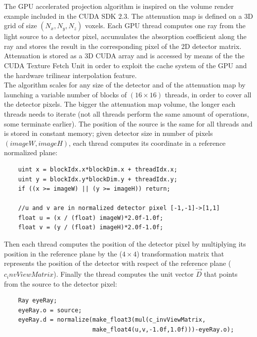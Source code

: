 \documentclass[12pt,a4paper]{report}
\begin{document}
The GPU accelerated projection algorithm is inspired on the volume render example included in the CUDA SDK $2.3$. 
The attenuation map is defined on a 3D grid of size $(N_x, N_y, N_z)$ voxels. 
Each GPU thread computes one ray from the light source to a detector pixel, accumulates the absorption coefficient along the ray and stores 
the result in the corresponding pixel of the 2D detector matrix. 
Attenuation is stored as a 3D CUDA array and is accessed by means of the the CUDA Texture Fetch Unit in order to exploit the cache 
system of the GPU and the hardware trilinear interpolation feature. \\
The algorithm scales for any size of the detector and of the attenuation map by launching a variable number of blocks of $(16\times 16)$ threads, in order 
to cover all the detector pixels. The bigger the attenuation map volume, the longer each threads needs to iterate (not all threads perform the same amount of operations, some 
terminate earlier). The position of the source is the same for all threads and is stored in constant memory; given detector size in number of pixels $(imageW,imageH)$, 
each thread computes its coordinate in a reference normalized plane: 

\vspace{5mm}
\lstset{language=C,basicstyle=\scriptsize}
\begin{lstlisting}
    uint x = blockIdx.x*blockDim.x + threadIdx.x;
    uint y = blockIdx.y*blockDim.y + threadIdx.y;
    if ((x >= imageW) || (y >= imageH)) return;

    //u and v are in normalized detector pixel [-1,-1]->[1,1]
    float u = (x / (float) imageW)*2.0f-1.0f;
    float v = (y / (float) imageH)*2.0f-1.0f;
\end{lstlisting}
\vspace{5mm}

\noindent Then each thread computes the position of the detector pixel by multiplying its position in the reference plane by 
the ($4\times 4$) transformation matrix that represents the position of the detector with respect of the reference plane ($c_invViewMatrix$). 
Finally the thread computes the unit vector $\vec{D}$ that points from the source to the detector pixel: 

\vspace{5mm}
\lstset{language=C,basicstyle=\scriptsize}
\begin{lstlisting}
    Ray eyeRay;
    eyeRay.o = source;
    eyeRay.d = normalize(make_float3(mul(c_invViewMatrix, 
                         make_float4(u,v,-1.0f,1.0f)))-eyeRay.o); 
\end{lstlisting}
\vspace{5mm}
\end{document}
